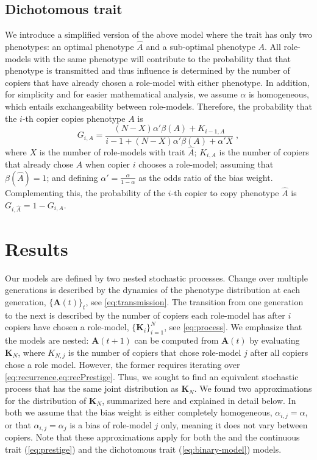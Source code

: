 \documentclass[12pt]{extarticle}
\let\vec\mathbf
\begin{document}
\subsection*{Dichotomous trait}
We introduce a simplified version of the above model where the trait has only two phenotypes: an optimal phenotype $\hat{A}$ and a sub-optimal phenotype $A$. 
All role-models with the same phenotype will contribute to the probability that that phenotype is transmitted and thus influence is determined by the number of copiers that have already chosen a role-model with either phenotype.
In addition, for simplicity and for easier mathematical analysis, we assume $\alpha$ is homogeneous, {which entails} exchangeability between role-models.
Therefore, the probability {that} the $i$-th copier {copies} phenotype $A$ is
\begin{equation}\label{eq:binary-model}
G_{i,A} = \frac{(N-X)\alpha'\beta(A) + K_{i-1,A}}{i-1 + (N-X)\alpha'\beta(A) + \alpha'X} \;,
\end{equation}
where $X$ is the number of role-models with trait $\hat{A}$; $K_{i,A}$ is the number of copiers that already chose $A$ when copier $i$ chooses a role-model; assuming that $\beta(\hat{A})=1$; and defining $\alpha'= \frac{\alpha}{1-\alpha}$ as the odds ratio of the bias weight.
Complementing this, the probability of the $i$-th copier to copy phenotype $\hat{A}$ is $G_{i, \hat{A}} = 1-G_{i,A}$.


\section*{Results}
Our models are defined by two nested stochastic processes. Change over multiple generations is described by the {dynamics of the} phenotype distribution at each generation, $\{\vec{A}(t)\}_t$, see \cref{eq:transmission}. The transition from one generation to the next is described by the number of copiers each role-model has after $i$ copiers have chosen a role-model, $\{\vec{K}_i\}_{i=1}^N$, see \cref{eq:process}.
We emphasize that the models are nested: $\vec{A}(t+1)$ can be computed from $\vec{A}(t)$ by evaluating $\vec{K}_{N}$, where $K_{N,j}$ is the number of copiers that chose role-model $j$ after all copiers chose a role model.
However, the former requires iterating over \cref{eq:recurrence,eq:recPrestige}.
Thus, we sought to find an equivalent stochastic process that has the same joint distribution as $\vec{K}_{N}$. 
We found two approximations for the distribution of $\vec{K}_{N}$, summarized here and explained in detail below.
In both we assume that the bias weight is either completely homogeneous, $\alpha_{i,j}=\alpha$, or that $\alpha_{i,j}=\alpha_j$ is a bias of role-model $j$ only, meaning it does not vary between copiers.
Note that these approximations apply for both the and the continuous trait (\cref{eq:prestige}) and the dichotomous trait (\cref{eq:binary-model}) models.
\end{document}
